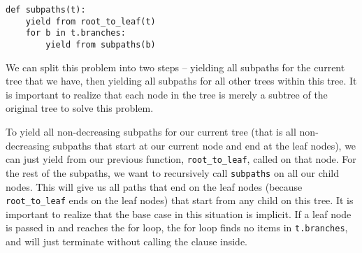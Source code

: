 \begin{parts}

\begin{solution}
\begin{lstlisting}
def subpaths(t):
    yield from root_to_leaf(t)
    for b in t.branches:
        yield from subpaths(b)
\end{lstlisting}

We can split this problem into two steps -- yielding all subpaths for the current tree that we have, then yielding all subpaths for all other trees within this tree. It is important to realize that each node in the tree is merely a subtree of the original tree to solve this problem.

To yield all non-decreasing subpaths for our current tree (that is all non-decreasing subpaths that start at our current node and end at the leaf nodes), we can just yield from our previous function, \lstinline{root_to_leaf}, called on that node. For the rest of the subpaths, we want to recursively call \lstinline{subpaths} on all our child nodes. This will give us all paths that end on the leaf nodes (because \lstinline{root_to_leaf} ends on the leaf nodes) that start from any child on this tree. It is important to realize that the base case in this situation is implicit. If a leaf node is passed in and reaches the for loop, the for loop finds no items in \lstinline{t.branches}, and will just terminate without calling the clause inside.
\end{solution}
\end{parts}

